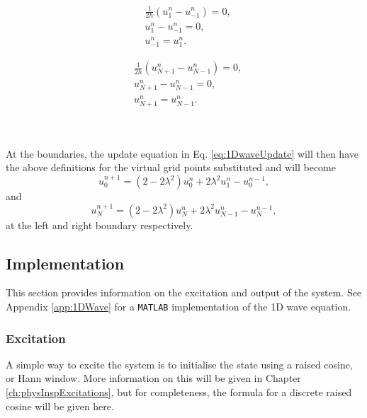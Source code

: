 \begin{minipage}[c]{0.49\textwidth}
    \begin{align*}
        &\frac{1}{2h} \left(u_1^n - u_{-1}^n\right) = 0,\\
        &u_1^n - u_{-1}^n = 0,\\
        &u_{-1}^n = u_1^n.
    \end{align*}
\end{minipage}
\begin{minipage}[c]{0.49\textwidth}
    \begin{align*}
        &\frac{1}{2h} \left(u_{N+1}^n - u_{N-1}^n\right) = 0,\\
        &u_{N+1}^n - u_{N-1}^n = 0,\\
        &u_{N+1}^n = u_{N-1}^n.
    \end{align*}
\end{minipage}
\\
\\
\noindent At the boundaries, the update equation in Eq. \eqref{eq:1DwaveUpdate} will then have the above definitions for the virtual grid points substituted and will become 
\begin{equation}\label{eq:1DWaveLeftBound}
    u_0^{n+1} = \left(2-2\lambda^2\right) u_0^n  + 2\lambda^2 u_1^n - u_0^{n-1},
\end{equation}
and 
\begin{equation}\label{eq:1DWaveRightBound}
    u_N^{n+1} = \left(2-2\lambda^2\right) u_N^n  + 2\lambda^2 u_{N-1}^n - u_N^{n-1},
\end{equation}
at the left and right boundary respectively.

\subsection{Implementation}\label{sec:output1DWave}
This section provides information on the excitation and output of the system. See Appendix \ref{app:1DWave} for a \texttt{MATLAB} implementation of the 1D wave equation.

\subsubsection{Excitation}
A simple way to excite the system is to initialise the state using a raised cosine, or Hann window. More information on this will be given in Chapter \ref{ch:physInspExcitations}, but for completeness, the formula for a discrete raised cosine will be given here. 

